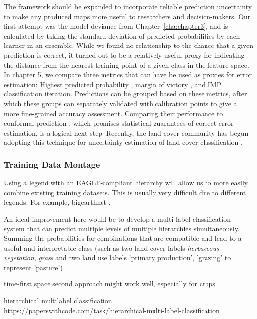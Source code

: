         
        The framework should be expanded to incorporate reliable prediction uncertainty to make any produced maps more useful to researchers and decision-makers. Our first attempt was the model deviance from Chapter\@~\ref{cha:chapter3}, and is calculated by taking the standard deviation of predicted probabilities by each learner in an ensemble. While we found no relationship to the chance that a given prediction is correct, it turned out to be a relatively useful proxy for indicating the distance from the nearest training point of a given class in the feature space. In chapter 5, we compare three metrics that can have be used as proxies for error estimation: Highest predicted probability \citep{niculescu2005predicting}, margin of victory \citep{calderon2021high}, and IMP classification iteration. Predictions can be grouped based on these metrics, after which these groups can separately validated with calibration points to give a more fine-grained accuracy assessment. Comparing their performance to conformal prediction \citep{angelopoulos2023predictionpowered}, which promises statistical guarantees of correct error estimation, is a logical next step. Recently, the land cover community has begun adopting this technique for uncertainty estimation of land cover classification \citep{valle2023quantifying, singh2024uncertainty}.

        \subsubsection{Training Data Montage}

        Using a legend with an EAGLE-compliant hierarchy will allow us to more easily combine existing training datasets. This is usually very difficult due to different legends. For example, bigearthnet \citep{sumbul2021bigearthnet}. 

        An ideal improvement here would be to develop a multi-label classification system that can predict multiple levels of multiple hierarchies simultaneously. Summing the probabilities for combinations that are compatible and lead to a useful and interpretable class (such as two land cover labels \textit{herbaceous vegetation}, \textit{grass} and two land use labels 'primary production', 'grazing' to represent 'pasture')

        time-first space second approach might work well, especially for crops \citep{xu2021towards}

        hierarchical multilabel classification https://paperswithcode.com/task/hierarchical-multi-label-classification
        

